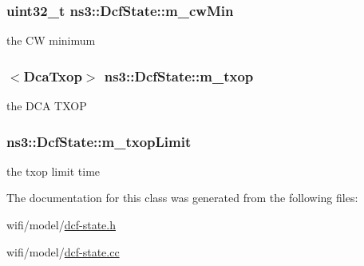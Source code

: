 \subsubsection[{\texorpdfstring{m\+\_\+cw\+Min}{m_cwMin}}]{\setlength{\rightskip}{0pt plus 5cm}uint32\+\_\+t ns3\+::\+Dcf\+State\+::m\+\_\+cw\+Min\hspace{0.3cm}{\ttfamily [protected]}}\hypertarget{classns3_1_1DcfState_aa74bf4018d28463df982732c59b59c89}{}\label{classns3_1_1DcfState_aa74bf4018d28463df982732c59b59c89}


the CW minimum 

\subsubsection[{\texorpdfstring{m\+\_\+txop}{m_txop}}]{$<${\bf Dca\+Txop}$>$ ns3\+::\+Dcf\+State\+::m\+\_\+txop\hspace{0.3cm}{\ttfamily [protected]}}\hypertarget{classns3_1_1DcfState_a58daee06113eff1a88d1dde9a79b4b74}{}\label{classns3_1_1DcfState_a58daee06113eff1a88d1dde9a79b4b74}


the D\+CA T\+X\+OP 

\subsubsection[{\texorpdfstring{m\+\_\+txop\+Limit}{m_txopLimit}}]{ ns3\+::\+Dcf\+State\+::m\+\_\+txop\+Limit\hspace{0.3cm}{\ttfamily [protected]}}\hypertarget{classns3_1_1DcfState_adaa9613e0e1354eacdde7d9d6452d67a}{}\label{classns3_1_1DcfState_adaa9613e0e1354eacdde7d9d6452d67a}


the txop limit time 



The documentation for this class was generated from the following files\+:\begin{DoxyCompactItemize}
\item 
wifi/model/\hyperlink{dcf-state_8h}{dcf-\/state.\+h}\item 
wifi/model/\hyperlink{dcf-state_8cc}{dcf-\/state.\+cc}\end{DoxyCompactItemize}
